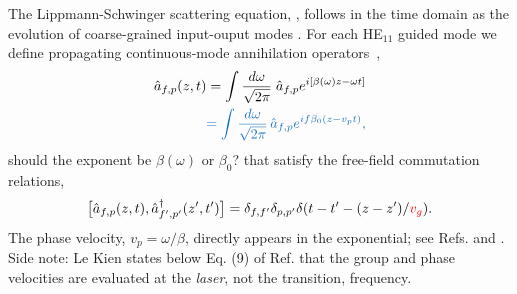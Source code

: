 \documentclass[preprint,aps,pra,onecolumn]{revtex4-1} %
\newcommand{\change}[1]{{\color{RoyalBlue} #1}}
\newcommand{\comment}[1]{{\color{Maroon} #1}}
\newcommand{\error}[1]{{\color{red} #1}}
\begin{document}
The Lippmann-Schwinger scattering equation, , follows in the time domain as the evolution of \error{coarse-grained} input-ouput modes \cite{gardiner_input_1985, fan_input-output_2010}.  For each HE$_{11}$ guided mode we define propagating continuous-mode annihilation operators~\cite{blow_continuum_1990, le_kien_correlations_2008},
\begin{align}
\hat{a}_{f,p}(z,t) = \int \frac{d \omega}{\sqrt{2 \pi}} \; \hat{a}_{f,p} e^{i[\beta(\omega)z-\omega t ]} \\
	 \change{ = \int \frac{d \omega}{\sqrt{2 \pi}} \, \hat{a}_{f,p} e^{i f \beta_0( z-v_p t)}, }
\end{align}
\comment{ should the exponent be $\beta(\omega)$ or $\beta_0$?}
that satisfy the free-field commutation relations,
\change{
\begin{equation}
\big[\hat{a}_{f,p}(z,t),\hat{a}^\dag_{f',p'}(z',t')\big]=\delta_{f,f'}\delta_{p,p'}  \delta(t-t'-(z-z')/\error{v_g}).
\end{equation}
}
\comment{The phase velocity, $v_p = \omega/\beta$, directly appears in the exponential; see Refs. \cite{le_kien_correlations_2008} and \cite{le_kien_propagation_2014}. Side note: Le Kien states below Eq. (9) of Ref. \cite{le_kien_propagation_2014} that the group and phase velocities are evaluated at the \emph{laser}, not the transition, frequency}.  
\end{document}
